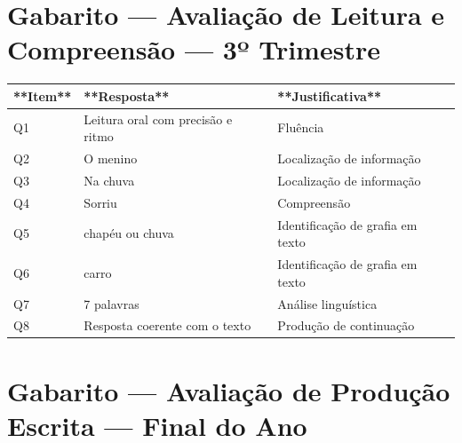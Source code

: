 \section{Gabarito --- Avaliação de Leitura e Compreensão — 3º Trimestre}

\begin{center}
\renewcommand{\arraystretch}{1.5}
\begin{tabular}{lll}
\toprule
**Item** & **Resposta** & **Justificativa** \\
\midrule

Q1 & Leitura oral com precisão e ritmo & Fluência \\

Q2 & O menino & Localização de informação \\

Q3 & Na chuva & Localização de informação \\

Q4 & Sorriu & Compreensão \\

Q5 & chapéu ou chuva & Identificação de grafia em texto \\

Q6 & carro & Identificação de grafia em texto \\

Q7 & 7 palavras & Análise linguística \\

Q8 & Resposta coerente com o texto & Produção de continuação \\

\bottomrule
\end{tabular}
\end{center}

\section{Gabarito --- Avaliação de Produção Escrita — Final do Ano}

